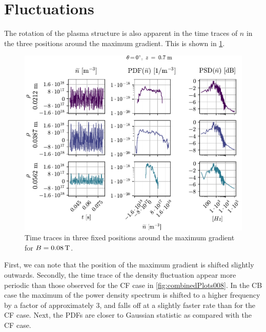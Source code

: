 \section{Fluctuations}
%
The rotation of the plasma structure is also apparent in the time traces of $n$ in the three positions around the maximum gradient.
This is shown in \cref{fig:comb008B}.
%
\begin{figure}[htb]
    \centering
    \includegraphics{fig/results/compareBouss/comb008B}
    \caption{Time traces in three fixed positions around the maximum gradient for $B=0.08\, \text{T}$.}
    \label{fig:comb008B}
\end{figure}
%
First, we can note that the position of the maximum gradient is shifted slightly outwards.
Secondly, the time trace of the density fluctuation appear more periodic than those observed for the CF case in \cref{fig:combinedPlots008}.
In the CB case the maximum of the power density spectrum is shifted to a higher frequency by a factor of approximately $3$, and falls off at a slightly faster rate than for the CF case.
Next, the PDFs are closer to Gaussian statistic as compared with the CF case.

